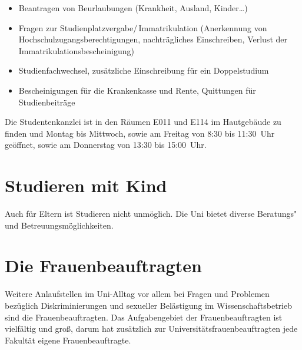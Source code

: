 \begin{itemize}
\item Beantragen von Beurlaubungen (Krankheit, Ausland, Kinder\ldots)
\item Fragen zur Studienplatzvergabe/\,Immatrikulation (Anerkennung von Hochschulzugangsberechtigungen, nachträgliches Einschreiben, Verlust der Immatrikulationsbescheinigung)
\item Studienfachwechsel, zusätzliche Einschreibung für ein Doppelstudium
\item Bescheinigungen für die Krankenkasse und Rente, Quittungen für Studienbeiträge
\end{itemize}

Die Studentenkanzlei ist in den Räumen E011 und E114 im Hautgebäude zu finden und Montag bis Mittwoch, sowie am Freitag von 8:30 bis 11:30~Uhr geöffnet, sowie am Donnerstag von 13:30 bis 15:00~Uhr.

\begin{urlList}
\end{urlList}


\section{Studieren mit Kind}

Auch für Eltern ist Studieren nicht unmöglich. Die Uni bietet diverse Beratungs"~ und Betreuungsmöglichkeiten.

\begin{urlList}
\end{urlList}

%

\section{Die Frauenbeauftragten}
Weitere Anlaufstellen im Uni-Alltag vor allem bei Fragen und Problemen bezüglich Diskriminierungen und sexueller Belästigung im Wissenschaftsbetrieb sind die Frauenbeauftragten.
Das Aufgabengebiet der Frauenbeauftragten ist vielfältig und groß, darum hat zusätzlich zur Universitätsfrauenbeauftragten jede Fakultät eigene Frauenbeauftragte.

